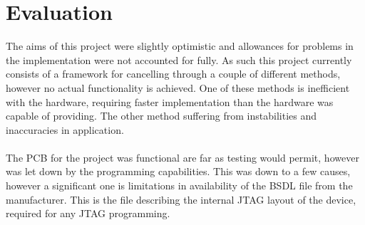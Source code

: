 \section{Evaluation}

The aims of this project were slightly optimistic and allowances for problems in the implementation were not accounted for fully.
As such this project currently consists of a framework for cancelling through a couple of different methods, however no actual functionality is achieved.
One of these methods is inefficient with the hardware, requiring faster implementation than the hardware was capable of providing.
The other method suffering from instabilities and inaccuracies in application.
\\
\\
The PCB for the project was functional are far as testing would permit, however was let down by the programming capabilities.
This was down to a few causes, however a significant one is limitations in availability of the BSDL file from the manufacturer.
This is the file describing the internal JTAG layout of the device, required for any JTAG programming.
